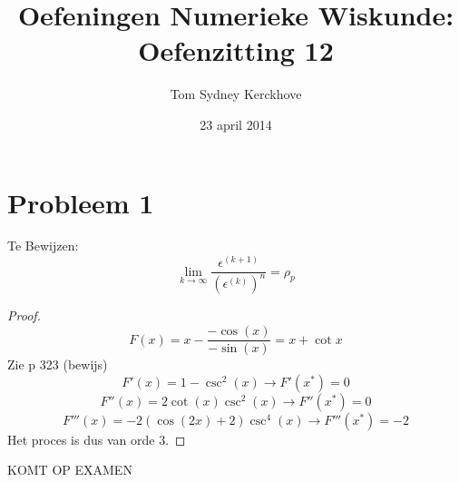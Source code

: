 \documentclass[12pt,a4paper]{article}
\author{Tom Sydney Kerckhove}
\title{Oefeningen Numerieke Wiskunde:\\ Oefenzitting 12}
\date{23 april 2014}
\begin{document}
\maketitle

\section{Probleem 1}
Te Bewijzen:
\[
\lim_{k\rightarrow\infty}\frac{\epsilon^{(k+1)}}{(\epsilon^{(k)})^{n}} = \rho_{p}
\]
\begin{proof}
\[
F(x) = x - \frac{-\cos(x)}{-\sin(x)} = x + \cot x
\]
Zie p 323 (bewijs)
\[
F'(x) = 1  - \csc^{2}(x) \rightarrow F'(x^{*}) = 0
\]
\[
F''(x) = 2\cot(x)\csc^2(x) \rightarrow F''(x^{*})= 0
\]
\[
F'''(x) = -2 (\cos(2x)+2) \csc^4(x) \rightarrow F'''(x^{*}) = -2
\]
Het proces is dus van orde $3$.
\end{proof}
KOMT OP EXAMEN
\end{document}
